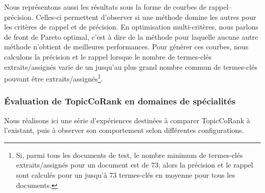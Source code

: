         Nous représentons aussi les résultats sous la forme de courbes de
        rappel--précision. Celles-ci permettent d'observer si une méthode domine
        les autres pour les critères de rappel et de précision. En optimisation
        multi-critères, nous parlons de front de Pareto optimal, c'est à dire de
        la méthode pour laquelle aucune autre méthode n'obtient de meilleures
        performances. Pour générer ces courbes, nous calculons la précision et
        le rappel lorsque  le nombre de termes-clés extraits/assignés varie de
        un jusqu'au plus grand nombre commun de termes-clés pouvant être
        extraits/assignés\footnote{Si, parmi tous les documents de test, le
        nombre minimum de termes-clés extraits/assignés pour un document est de
        73, alors la précision et le rappel sont calculés pour un jusqu'à 73
        termes-clés en moyenne pour tous les documents.}.
      
      \subsubsection{Évaluation de TopicCoRank en domaines de spécialités}
      \label{subsubsec:main-domain_specific_keyphrase_annotation-supervised_automatic_keyphrase_annotation-evaluation-topiccorank_specific_domains}
        Nous réalisons ici une série d'expériences destinées à comparer
        TopicCoRank à l'existant, puis à observer son comportement selon
        différentes configurations.

